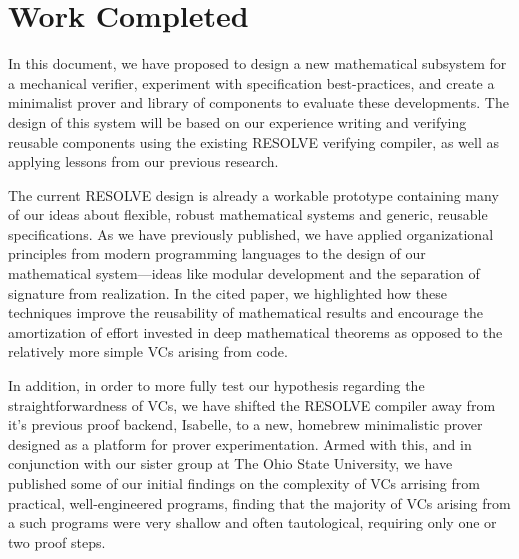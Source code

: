 \section{Work Completed}\label{sect:workCompleted}
In this document, we have proposed to design a new mathematical subsystem for a mechanical verifier, experiment with specification best-practices, and create a minimalist prover and library of components to evaluate these developments.  The design of this system will be based on our experience writing and verifying reusable components using the existing RESOLVE verifying compiler, as well as applying lessons from our previous research.

The current RESOLVE design is already a workable prototype containing many of our ideas about flexible, robust mathematical systems and generic, reusable specifications.  As we have previously published, we have applied organizational principles from modern programming languages to the design of our mathematical system\cite{SmithSAVCBS2008}---ideas like modular development and the separation of signature from realization.  In the cited paper, we highlighted how these techniques improve the reusability of mathematical results and encourage the amortization of effort invested in deep mathematical theorems as opposed to the relatively more simple VCs arising from code.

In addition, in order to more fully test our hypothesis regarding the straightforwardness of VCs, we have shifted the RESOLVE compiler away from it's previous proof backend, Isabelle\cite{Isabelle}, to a new, homebrew minimalistic prover\cite{SmithICSRResolve} designed as a platform for prover experimentation.  Armed with this, and in conjunction with our sister group at The Ohio State University, we have published some of our initial findings on the complexity of VCs arrising from practical, well-engineered programs\cite{deepMathematics}, finding that the majority of VCs arising from a such programs were very shallow and often tautological, requiring only one or two proof steps.

